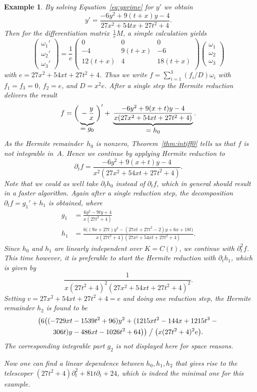 \documentclass{sig-alternate}
\newtheorem{example}[theorem]{Example}
\begin{document}
\begin{example}
By solving Equation~\eqref{eq:yprime} for $y'$ we obtain
\[
  y' = \frac{-6y^2 + 9(t+x)y - 4}{27x^2+54tx+27t^2+4}.
\]
Then for the differentiation matrix~$\frac1eM$, a simple calculation yields
\[
  \begin{pmatrix} \omega_1' \\[1pt] \omega_2' \\[1pt] \omega_3' \end{pmatrix} =
  \frac{1}{e} \begin{pmatrix} 0 & 0 & 0 \\[1pt] -4 & 9 (t+x) & -6 \\[1pt] 12 (t+x) & 4 & 18 (t+x) \\ \end{pmatrix}
  \begin{pmatrix} \omega_1 \\[1pt] \omega_2 \\[1pt] \omega_3 \end{pmatrix}
\]
with $e=27x^2+54xt+27t^2+4$. Thus we write $f=\sum_{i=1}^3 (f_i/D) \omega_i$ with
$f_1=f_3=0$, $f_2=e$, and $D=x^2e$.  After a single step the Hermite reduction
delivers the result
\[
  f = \biggl(\, \underbrace{\vphantom{\frac{1}{(x)}} -\frac{y}{x}}_{\textstyle=g_0} \;\biggr)' +\>
  \underbrace{\frac{-6y^2+9(x+t)y-4}{x(27x^2+54xt+27t^2+4)}}_{\textstyle=h_0}.
\]
As the Hermite remainder~$h_0$ is nonzero, Theorem~\ref{thm:intiff0} tells us that
$f$ is not integrable in~$A$. Hence we continue by applying Hermite reduction to
\[
  \partial_tf = \frac{-6y^2+9(x+t)y-4}{x^2(27x^2+54xt+27t^2+4)}.
\]
Note that we could as well take $\partial_th_0$ instead of $\partial_tf$, which
in general should result in a faster algorithm.
Again after a single reduction step, the decomposition $\partial_tf = g_1' + h_1$
is obtained, where
\begin{align*}
  g_1 &= \frac{6y^2-9ty+4}{x(27t^2+4)} \\
  h_1 &= \frac{6\bigl((9x+27t)y^2-(27xt+27t^2-2)y+6x+18t\bigr)}{x(27t^2+4)(27x^2+54xt+27t^2+4)}.
\end{align*}
Since $h_0$ and $h_1$ are linearly independent over $K=C(t)$, we continue with
$\partial_t^2f$.
This time however, it is preferable to start the Hermite reduction
with $\partial_th_1$, which is given by
\[
  \frac{1}{x(27t^2+4)^2(27x^2+54xt+27t^2+4)^2}.
\]
Setting $v=27x^2+54xt+27t^2+4=e$ and doing one reduction step,
the Hermite remainder $h_2$ is found to be
\begin{multline*}
 \bigl(6\bigl((-729xt-1539t^2+96)y^2+(1215xt^2-144x+1215t^3-{}\\
 306t)y-486xt-1026t^2+64\bigr)\bigr)\mathrel{\big\slash}\bigl(x(27t^2+4)^2e\bigr).
\end{multline*}
The corresponding integrable part $g_2$ is not displayed here for space reasons.

Now one can find a linear dependence between $h_0,h_1,h_2$ that gives rise to the telescoper
$(27t^2+4)\partial_t^2+81t\partial_t+24$, which is indeed the minimal one for this example.
\end{example}
\end{document}
